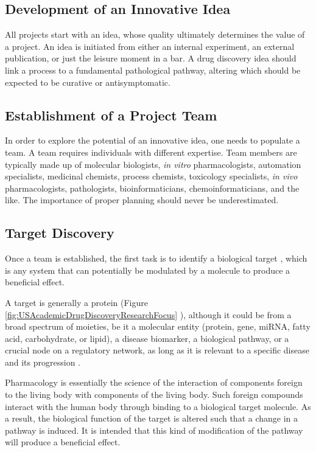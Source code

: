 \subsection{Development of an Innovative Idea}

All projects start with an idea, whose quality ultimately determines the value of a project. An idea is initiated from either an internal experiment, an external publication, or just the leisure moment in a bar. A drug discovery idea should link a process to a fundamental pathological pathway, altering which should be expected to be curative or antisymptomatic.

\subsection{Establishment of a Project Team}

In order to explore the potential of an innovative idea, one needs to populate a team. A team requires individuals with different expertise. Team members are typically made up of molecular biologists, \textit{in vitro} pharmacologists, automation specialists, medicinal chemists, process chemists, toxicology specialists, \textit{in vivo} pharmacologists, pathologists, bioinformaticians, chemoinformaticians, and the like. The importance of proper planning should never be underestimated.

\subsection{Target Discovery}

Once a team is established, the first task is to identify a biological target \citep{706,355,356,357,797}, which is any system that can potentially be modulated by a molecule to produce a beneficial effect.

A target is generally a protein (Figure \ref{fig:USAcademicDrugDiscoveryResearchFocus} \citep{721}), although it could be from a broad spectrum of moieties, be it a molecular entity (protein, gene, miRNA, fatty acid, carbohydrate, or lipid), a disease biomarker, a biological pathway, or a crucial node on a regulatory network, as long as it is relevant to a specific disease and its progression \citep{711}.

Pharmacology is essentially the science of the interaction of components foreign to the living body with components of the living body. Such foreign compounds interact with the human body through binding to a biological target molecule. As a result, the biological function of the target is altered such that a change in a pathway is induced. It is intended that this kind of modification of the pathway will produce a beneficial effect.

